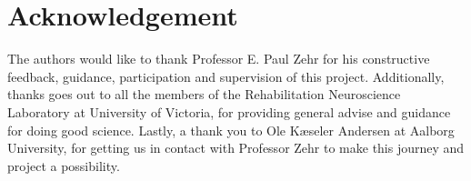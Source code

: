 \section*{Acknowledgement} 

The authors would like to thank Professor E. Paul Zehr for his constructive feedback, guidance, participation and supervision of this project. Additionally, thanks goes out to all the members of the Rehabilitation Neuroscience Laboratory at University of Victoria, for providing general advise and guidance for doing good science. Lastly, a thank you to Ole Kæseler Andersen at Aalborg University, for getting us in contact with Professor Zehr to make this journey and project a possibility. 